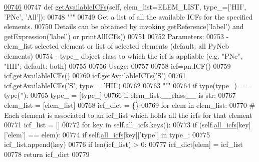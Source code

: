 \begin{DoxyCode}
\hypertarget{classpyneb_1_1core_1_1icf_1_1_i_c_f_l00746}{}\hyperlink{classpyneb_1_1core_1_1icf_1_1_i_c_f_a4cacc6d494ce482990e513f4cf728e30}{00746} 
00747     \textcolor{keyword}{def }\hyperlink{classpyneb_1_1core_1_1icf_1_1_i_c_f_a4cacc6d494ce482990e513f4cf728e30}{getAvailableICFs}(self, elem\_list=ELEM\_LIST, type\_=['HII', 'PNe', 'All']):
00748         \textcolor{stringliteral}{""" }
00749 \textcolor{stringliteral}{        Get a list of all the available ICFs for the specified elements. }
00750 \textcolor{stringliteral}{        Details can be obtained by invoking getReference('label') and getExpression('label') or
       printAllICFs()}
00751 \textcolor{stringliteral}{        }
00752 \textcolor{stringliteral}{        Parameters:}
00753 \textcolor{stringliteral}{            - elem\_list    selected element or list of selected elements (default: all PyNeb elements)}
00754 \textcolor{stringliteral}{            - type\_         dbject class to which the icf is appliable (e.g. "PNe", "HII"; default: both)}
00755 \textcolor{stringliteral}{        }
00756 \textcolor{stringliteral}{        Usage:}
00757 \textcolor{stringliteral}{        }
00758 \textcolor{stringliteral}{        icf=pn.ICF()}
00759 \textcolor{stringliteral}{        icf.getAvailableICFs()}
00760 \textcolor{stringliteral}{        icf.getAvailableICFs('S')}
00761 \textcolor{stringliteral}{        icf.getAvailableICFs('S', type\_='HII')}
00762 \textcolor{stringliteral}{}
00763 \textcolor{stringliteral}{        """}        
00764         \textcolor{keywordflow}{if} type(type\_) == type(\textcolor{stringliteral}{''}):
00765             type\_ = [type\_] 
00766         \textcolor{keywordflow}{if} elem\_list.\_\_class\_\_ \textcolor{keywordflow}{is} str:
00767             elem\_list = [elem\_list]
00768         icf\_dict = \{\}
00769         \textcolor{keywordflow}{for} elem \textcolor{keywordflow}{in} elem\_list:
00770             \textcolor{comment}{# Each element is associated to an icf\_list which holds all the icfs for that element }
00771             icf\_list = []
00772             \textcolor{keywordflow}{for} key \textcolor{keywordflow}{in} self.all\_icfs.keys():
00773                 \textcolor{keywordflow}{if} (self.\hyperlink{classpyneb_1_1core_1_1icf_1_1_i_c_f_a854ee87a53feb102e429e902227ce88b}{all\_icfs}[key][\textcolor{stringliteral}{'elem'}] == elem):
00774                     \textcolor{keywordflow}{if} self.\hyperlink{classpyneb_1_1core_1_1icf_1_1_i_c_f_a854ee87a53feb102e429e902227ce88b}{all\_icfs}[key][\textcolor{stringliteral}{'type'}] \textcolor{keywordflow}{in} type\_:
00775                         icf\_list.append(key)
00776             \textcolor{keywordflow}{if} len(icf\_list) > 0:
00777                 icf\_dict[elem] = icf\_list        
00778         \textcolor{keywordflow}{return} icf\_dict
00779    
    
\end{DoxyCode}
